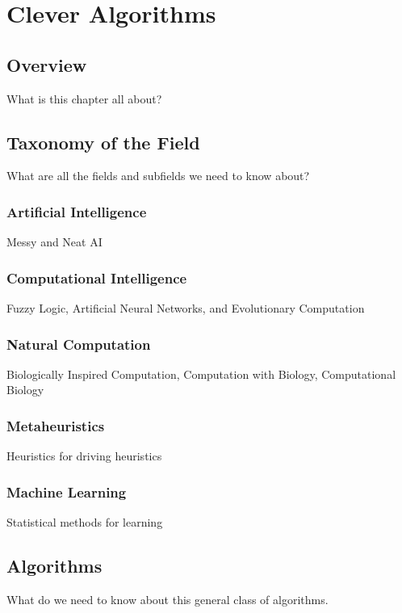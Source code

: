 \chapter{Clever Algorithms}
\label{chap:field}

\section{Overview}
What is this chapter all about?


\section{Taxonomy of the Field}
What are all the fields and subfields we need to know about?

\subsection{Artificial Intelligence}
Messy and Neat AI

\subsection{Computational Intelligence}
Fuzzy Logic, Artificial Neural Networks, and Evolutionary Computation

\subsection{Natural Computation}
Biologically Inspired Computation, Computation with Biology, Computational Biology 

\subsection{Metaheuristics}
Heuristics for driving heuristics

\subsection{Machine Learning}
Statistical methods for learning



\section{Algorithms}
What do we need to know about this general class of algorithms.

